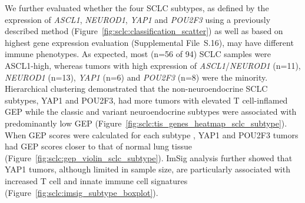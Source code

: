 We further evaluated whether the four SCLC subtypes, as defined by the expression of \textit{ASCL1}, \textit{NEUROD1}, \textit{YAP1} and \textit{POU2F3} using a previously described method \cite{rudin2019} (Figure~\ref{fig:sclc:classification_scatter}) as well as based on highest gene expression evaluation (Supplemental File~S\thechapter{}.16), may have different immune phenotypes. As expected, most (n=56 of 94) SCLC samples were ASCL1-high, whereas tumors with high expression of \textit{ASCL1}/\textit{NEUROD1} (n=11), \textit{NEUROD1} (n=13), \textit{YAP1} (n=6) and \textit{POU2F3} (n=8) were the minority. Hierarchical clustering demonstrated that the non-neuroendocrine SCLC subtypes, YAP1 and POU2F3, had more tumors with elevated T cell-inflamed GEP while the classic and variant neuroendocrine subtypes were associated with predominantly low GEP (Figure~\ref{fig:sclc:tis_genes_heatmap_sclc_subtype}). When GEP scores were calculated for each subtype \cite{cristescu2018}, YAP1 and POU2F3 tumors had GEP scores closer to that of normal lung tissue (Figure~\ref{fig:sclc:gep_violin_sclc_subtype}). ImSig analysis further showed that YAP1 tumors, although limited in sample size, are particularly associated with increased T cell and innate immune cell signatures (Figure~\ref{fig:sclc:imsig_subtype_boxplot}).



